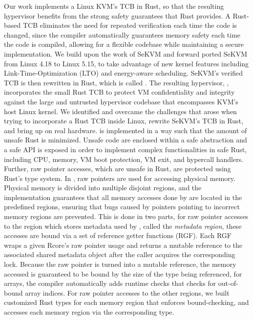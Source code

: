 Our work implements a Linux KVM's TCB in Rust, so that the resulting hypervisor
benefits from the strong safety guarantees that Rust provides.
A Rust-based TCB eliminates the need for repeated verification each time the
code is changed, since the compiler automatically guarantees memory safety each
time the code is compiled, allowing for a flexible codebase while maintaining
a secure implementation.
We build upon the work of SeKVM \cite{sekvm} and forward ported SeKVM
from Linux 4.18 to Linux 5.15, to take advantage of new kernel features
including Link-Time-Optimization (LTO) and energy-aware scheduling. SeKVM's
verified TCB \textit{\secore{}} is then rewritten in Rust, which is called
\textit{\rustcore{}}.
The resulting hypervisor, \rustsec{}, incorporates the small Rust TCB
\rustcore{} to
protect VM confidentiality and integrity against the large and untrusted
hypervisor codebase that encompasses KVM’s host Linux kernel.
We identified and overcame the challenges that arose when trying to
incorporate a Rust TCB inside Linux, rewrite SeKVM's TCB in Rust, and bring up
\rustsec{} on real hardware.
\rustcore{} is implemented in a way such that the amount of unsafe Rust is
minimized.
Unsafe code are enclosed within a safe abstraction and a safe API is exposed
in order to implement complex functionalities in safe Rust, including CPU,
memory, VM boot protection, VM exit, and hypercall handlers.
Further, raw pointer accesses, which are unsafe in Rust, are protected using
Rust’s type system. In \rustcore{}, raw pointers are used for accessing
physical memory. Physical memory is divided into multiple disjoint regions,
and the \rustcore{} implementation guarantees that all memory accesses done by
\rustcore{} are located in the predefined regions, ensuring that bugs caused by
pointers pointing to incorrect memory regions are prevented.
This is done in two parts, for raw pointer accesses to the region which stores
metadata used by \rustcore{}, called the \textit{\rustcore{} metadata region},
these accesses are bound via a set of reference getter functions (RGF).
Each RGF wraps a given Rcore’s raw pointer usage and returns a mutable
reference to the associated shared metadata object after the caller acquires
the corresponding lock. Because the raw pointer is turned into a mutable
reference, the memory accessed is guaranteed to be bound by the size of the
type being referenced, for arrays, the compiler automatically adds runtime
checks that checks for out-of-bound array indices.
For raw pointer accesses to the other regions, we built customized Rust types
for each memory region that enforces bound-checking, and \rustcore{} accesses
each memory region via the corresponding type.

